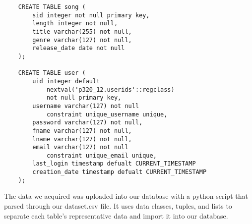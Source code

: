 \documentclass[12pt]{article}
\begin{document}
    \begin{lstlisting}
    CREATE TABLE song (
        sid integer not null primary key,
        length integer not null,
        title varchar(255) not null,
        genre varchar(127) not null,
        release_date date not null
    );

    CREATE TABLE user (
        uid integer default
            nextval('p320_12.userids'::regclass)
            not null primary key,
        username varchar(127) not null
            constraint unique_username unique,
        password varchar(127) not null,
        fname varchar(127) not null,
        lname varchar(127) not null,
        email varchar(127) not null
            constraint unique_email unique,
        last_login timestamp defualt CURRENT_TIMESTAMP
        creation_date timestamp defualt CURRENT_TIMESTAMP
    );
    \end{lstlisting}
    The data we acquired was uploaded into our database with a python script that parsed through our dataset.csv
    file. It uses data classes, tuples, and lists to separate each table's representative data
    and import it into our database.
\end{document}
